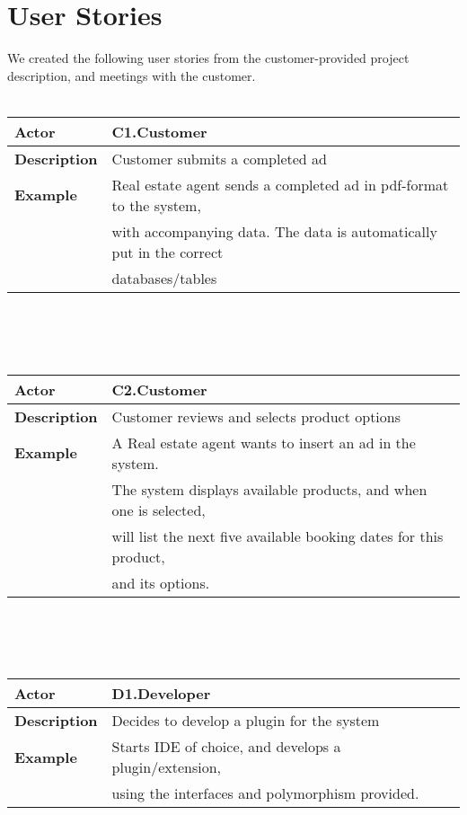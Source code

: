 \documentclass[12pt, a4paper]{article}
\begin{document}
\section{User Stories}

We created the following user stories from the customer-provided project
description, and meetings with the customer.
\\\\
\begin{tabular}{| l | l |}
	\hline
	\textbf{Actor} & C1.Customer \\
	\hline
	\textbf{Description} & Customer submits a completed ad \\
	\hline
	\textbf{Example} & Real estate agent sends a completed ad in pdf-format to the system,\\
	& with accompanying data. The data is automatically put in the correct\\
	& databases/tables \\
	\hline
	
\end{tabular}
\\\\\\
\begin{tabular}{| l | l |}
	\hline
	\textbf{Actor} & C2.Customer \\
	\hline
	\textbf{Description} & Customer reviews and selects product options \\
	\hline
	\textbf{Example} & A Real estate agent wants to insert an ad in the system.\\
	& The system displays available products, and when one is selected,\\
	& will list the next five available booking dates for this product,\\
	& and its options.\\
	\hline
	
\end{tabular}
\\\\\\
\begin{tabular}{| l | l |}
	\hline
	\textbf{Actor} & D1.Developer \\
	\hline
	\textbf{Description} & Decides to develop a plugin for the system \\
	\hline
	\textbf{Example} & Starts IDE of choice, and develops a plugin/extension,\\
	& using the interfaces and polymorphism provided. \\
	\hline
	
\end{tabular}
\end{document}
